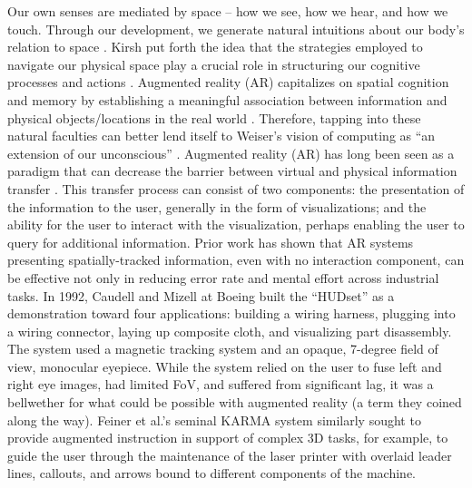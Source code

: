 \documentclass [11pt, proquest] {uwthesis}[2020/02/24]
\begin{document}
Our own senses are mediated by space -- how we see, how we hear, and how we touch. Through our development, we generate natural intuitions about our body's relation to space \cite{Piaget1954-wp}. Kirsh put forth the idea that the strategies employed to navigate our physical space play a crucial role in structuring our cognitive processes and actions \cite{Kirsh1995-rg}. Augmented reality (AR) capitalizes on spatial cognition and memory by establishing a meaningful association between information and physical objects/locations in the real world \cite{Biocca2003-pk}. Therefore, tapping into these natural faculties can better lend itself to Weiser's vision of computing as “an extension of our unconscious” \cite{Weiser1996-zr}.
Augmented reality (AR) has long been seen as a paradigm that can decrease the barrier between virtual and physical information transfer \cite{Brooks1988-ug}.
This transfer process can consist of two components: the presentation of the information to the user, generally in the form of visualizations; and the ability for the user to interact with the visualization, perhaps enabling the user to query for additional information.
Prior work has shown that AR systems presenting spatially-tracked information, even with no interaction component, can be effective not only in reducing error rate and mental effort across industrial tasks.
In 1992, Caudell and Mizell at Boeing built the “HUDset” \cite{Caudell1992AugmentedProcesses} as a demonstration toward four applications: building a wiring harness, plugging into a wiring connector, laying up composite cloth, and visualizing part disassembly. The system used a magnetic tracking system and an opaque, 7-degree field of view, monocular eyepiece. While the system relied on the user to fuse left and right eye images, had limited FoV, and suffered from significant lag, it was a bellwether for what could be possible with augmented reality (a term they coined along the way).
Feiner et al.’s seminal KARMA system \cite{Feiner1993Knowledge-basedReality} similarly sought to provide augmented instruction in support of complex 3D tasks, for example, to guide the user through the maintenance of the laser printer with overlaid leader lines, callouts, and arrows bound to different components of the machine. 
\end{document}
